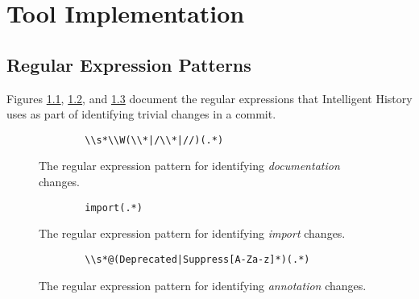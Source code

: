 \chapter{Tool Implementation}


\section{Regular Expression Patterns}
\label{sec:Reg-Ex-Patterns}

Figures \ref{fig:Documentation-Reg-Ex}, \ref{fig:Import-Reg-Ex}, and \ref{fig:Annotation-Reg-Ex}
document the regular expressions that Intelligent History uses as part of identifying trivial changes in a commit.

\vspace{50px}

\begin{figure}[h]
    \begin{verbatim}
        \\s*\\W(\\*|/\\*|//)(.*)
    \end{verbatim}
    \caption{The regular expression pattern for identifying \textit{documentation} changes.}
    \label{fig:Documentation-Reg-Ex}
\end{figure}

\begin{figure}[h]
    \begin{verbatim}
        import(.*)
    \end{verbatim}
    \caption{The regular expression pattern for identifying \textit{import} changes.}
    \label{fig:Import-Reg-Ex}
\end{figure}

\begin{figure}[h]
    \begin{verbatim}
        \\s*@(Deprecated|Suppress[A-Za-z]*)(.*)
    \end{verbatim}
    \caption{The regular expression pattern for identifying \textit{annotation} changes.}
    \label{fig:Annotation-Reg-Ex}
\end{figure}

\endinput